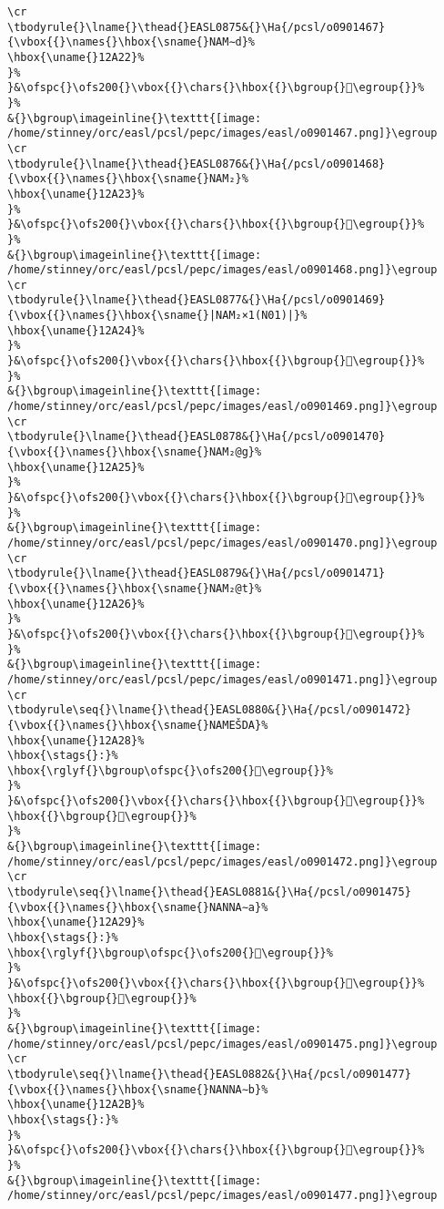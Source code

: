 \begin{verbatim}
\cr
\tbodyrule{}\lname{}\thead{}EASL0875&{}\Ha{/pcsl/o0901467}{\vbox{{}\names{}\hbox{\sname{}NAM∼d}%
\hbox{\uname{}12A22}%
}%
}&\ofspc{}\ofs200{}\vbox{{}\chars{}\hbox{{}\bgroup{}𒨢\egroup{}}%
}%
&{}\bgroup\imageinline{}\texttt{[image: /home/stinney/orc/easl/pcsl/pepc/images/easl/o0901467.png]}\egroup
\cr
\tbodyrule{}\lname{}\thead{}EASL0876&{}\Ha{/pcsl/o0901468}{\vbox{{}\names{}\hbox{\sname{}NAM₂}%
\hbox{\uname{}12A23}%
}%
}&\ofspc{}\ofs200{}\vbox{{}\chars{}\hbox{{}\bgroup{}𒨣\egroup{}}%
}%
&{}\bgroup\imageinline{}\texttt{[image: /home/stinney/orc/easl/pcsl/pepc/images/easl/o0901468.png]}\egroup
\cr
\tbodyrule{}\lname{}\thead{}EASL0877&{}\Ha{/pcsl/o0901469}{\vbox{{}\names{}\hbox{\sname{}|NAM₂×1(N01)|}%
\hbox{\uname{}12A24}%
}%
}&\ofspc{}\ofs200{}\vbox{{}\chars{}\hbox{{}\bgroup{}𒨤\egroup{}}%
}%
&{}\bgroup\imageinline{}\texttt{[image: /home/stinney/orc/easl/pcsl/pepc/images/easl/o0901469.png]}\egroup
\cr
\tbodyrule{}\lname{}\thead{}EASL0878&{}\Ha{/pcsl/o0901470}{\vbox{{}\names{}\hbox{\sname{}NAM₂@g}%
\hbox{\uname{}12A25}%
}%
}&\ofspc{}\ofs200{}\vbox{{}\chars{}\hbox{{}\bgroup{}𒨥\egroup{}}%
}%
&{}\bgroup\imageinline{}\texttt{[image: /home/stinney/orc/easl/pcsl/pepc/images/easl/o0901470.png]}\egroup
\cr
\tbodyrule{}\lname{}\thead{}EASL0879&{}\Ha{/pcsl/o0901471}{\vbox{{}\names{}\hbox{\sname{}NAM₂@t}%
\hbox{\uname{}12A26}%
}%
}&\ofspc{}\ofs200{}\vbox{{}\chars{}\hbox{{}\bgroup{}𒨦\egroup{}}%
}%
&{}\bgroup\imageinline{}\texttt{[image: /home/stinney/orc/easl/pcsl/pepc/images/easl/o0901471.png]}\egroup
\cr
\tbodyrule\seq{}\lname{}\thead{}EASL0880&{}\Ha{/pcsl/o0901472}{\vbox{{}\names{}\hbox{\sname{}NAMEŠDA}%
\hbox{\uname{}12A28}%
\hbox{\stags{}:}%
\hbox{\rglyf{}\bgroup\ofspc{}\ofs200{}𒨨\egroup{}}%
}%
}&\ofspc{}\ofs200{}\vbox{{}\chars{}\hbox{{}\bgroup{}𒨧\egroup{}}%
\hbox{{}\bgroup{}𒨨\egroup{}}%
}%
&{}\bgroup\imageinline{}\texttt{[image: /home/stinney/orc/easl/pcsl/pepc/images/easl/o0901472.png]}\egroup
\cr
\tbodyrule\seq{}\lname{}\thead{}EASL0881&{}\Ha{/pcsl/o0901475}{\vbox{{}\names{}\hbox{\sname{}NANNA∼a}%
\hbox{\uname{}12A29}%
\hbox{\stags{}:}%
\hbox{\rglyf{}\bgroup\ofspc{}\ofs200{}𒨩\egroup{}}%
}%
}&\ofspc{}\ofs200{}\vbox{{}\chars{}\hbox{{}\bgroup{}𒨩\egroup{}}%
\hbox{{}\bgroup{}𒨪\egroup{}}%
}%
&{}\bgroup\imageinline{}\texttt{[image: /home/stinney/orc/easl/pcsl/pepc/images/easl/o0901475.png]}\egroup
\cr
\tbodyrule\seq{}\lname{}\thead{}EASL0882&{}\Ha{/pcsl/o0901477}{\vbox{{}\names{}\hbox{\sname{}NANNA∼b}%
\hbox{\uname{}12A2B}%
\hbox{\stags{}:}%
}%
}&\ofspc{}\ofs200{}\vbox{{}\chars{}\hbox{{}\bgroup{}𒨫\egroup{}}%
}%
&{}\bgroup\imageinline{}\texttt{[image: /home/stinney/orc/easl/pcsl/pepc/images/easl/o0901477.png]}\egroup

\end{verbatim}
